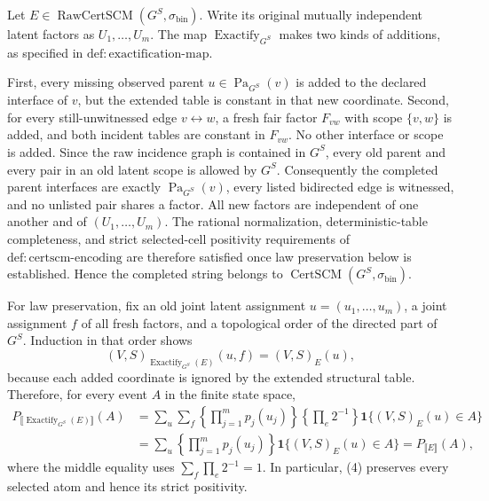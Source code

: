 Let \(E\in\operatorname{RawCertSCM}(G^S,\sigma_{\mathrm{bin}})\).  Write its original mutually independent latent factors as \(U_1,\ldots,U_m\).  The map \(\operatorname{Exactify}_{G^S}\) makes two kinds of additions, as specified in \(\mathrm{def:exactification\text{-}map}\).

First, every missing observed parent \(u\in\operatorname{Pa}_{G^S}(v)\) is added to the declared interface of \(v\), but the extended table is constant in that new coordinate.  Second, for every still-unwitnessed edge \(v\leftrightarrow w\), a fresh fair factor \(F_{vw}\) with scope \(\{v,w\}\) is added, and both incident tables are constant in \(F_{vw}\).  No other interface or scope is added.  Since the raw incidence graph is contained in \(G^S\), every old parent and every pair in an old latent scope is allowed by \(G^S\).  Consequently the completed parent interfaces are exactly \(\operatorname{Pa}_{G^S}(v)\), every listed bidirected edge is witnessed, and no unlisted pair shares a factor.  All new factors are independent of one another and of \((U_1,\ldots,U_m)\).  The rational normalization, deterministic-table completeness, and strict selected-cell positivity requirements of \(\mathrm{def:certscm\text{-}encoding}\) are therefore satisfied once law preservation below is established.  Hence the completed string belongs to \(\operatorname{CertSCM}(G^S,\sigma_{\mathrm{bin}})\).

For law preservation, fix an old joint latent assignment \(u=(u_1,\ldots,u_m)\), a joint assignment \(f\) of all fresh factors, and a topological order of the directed part of \(G^S\).  Induction in that order shows
\[
  (V,S)_{\operatorname{Exactify}_{G^S}(E)}(u,f)=(V,S)_E(u), \tag{3}
\]
because each added coordinate is ignored by the extended structural table.  Therefore, for every event \(A\) in the finite state space,
\[
\begin{aligned}
 P_{\llbracket\operatorname{Exactify}_{G^S}(E)\rrbracket}(A)
 &=\sum_u\sum_f
   \left\{\prod_{j=1}^m p_j(u_j)\right\}
   \left\{\prod_{e}2^{-1}\right\}
   \mathbf 1\{(V,S)_E(u)\in A\}\\
 &=\sum_u\left\{\prod_{j=1}^m p_j(u_j)\right\}
   \mathbf 1\{(V,S)_E(u)\in A\}
 =P_{\llbracket E\rrbracket}(A), \tag{4}
\end{aligned}
\]
where the middle equality uses \(\sum_f\prod_e2^{-1}=1\).  In particular, (4) preserves every selected atom and hence its strict positivity.

